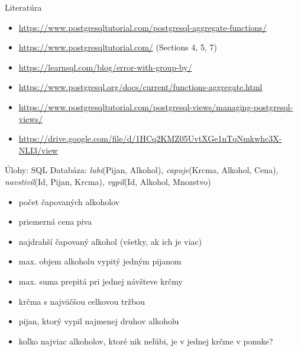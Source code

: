 \documentclass[12pt]{beamer}
\begin{document}
\begin{frame}{Literatúra}
\begin{itemize}
\item {\scriptsize\url{https://www.postgresqltutorial.com/postgresql-aggregate-functions/}}
\item {\scriptsize\url{https://www.postgresqltutorial.com/} (Sections 4, 5, 7)}
\item {\scriptsize\url{https://learnsql.com/blog/error-with-group-by/}}
\item {\scriptsize\url{https://www.postgresql.org/docs/current/functions-aggregate.html}}
\item {\scriptsize\url{https://www.postgresqltutorial.com/postgresql-views/managing-postgresql-views/}}
\item {\scriptsize\url{https://drive.google.com/file/d/1HCq2KMZ05UvtXGe1nTqNmkwhc3X-NLI3/view}}
\end{itemize}
\end{frame}


\begin{frame}{Úlohy: SQL}
Databáza: \emph{lubi}(Pijan, Alkohol), \emph{capuje}(Krcma, Alkohol, Cena),
\emph{navstivil}(Id, Pijan, Krcma), \emph{vypil}(Id, Alkohol, Mnozstvo)
\begin{itemize}
	\item počet čapovaných alkoholov
	\item priemerná cena piva
	\item najdrahší čapovaný alkohol (všetky, ak ich je viac)
    \item max. objem alkoholu vypitý jedným pijanom
    \item max. suma prepitá pri jednej návšteve krčmy
    \item krčma s najväčšou celkovou tržbou
    \item pijan, ktorý vypil najmenej druhov alkoholu
    \item koľko najviac alkoholov, ktoré nik neľúbi, je v jednej krčme v ponuke?
\end{itemize}
\end{frame}
\end{document}
